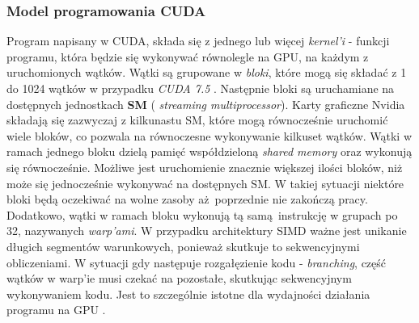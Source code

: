 \subsubsection{Model programowania CUDA}
Program napisany w CUDA, składa się z jednego lub więcej
\textit{kernel'i} - funkcji programu, która będzie się wykonywać równolegle na GPU, na każdym z uruchomionych wątków.
Wątki są grupowane w \textit{bloki}, które mogą się składać z 1 do 1024 wątków w przypadku \textit{CUDA 7.5} \cite{CudaDeveloper}.
Następnie bloki są uruchamiane na dostępnych jednostkach \textbf{SM} ( \textit{streaming multiprocessor}).
Karty graficzne Nvidia składają się zazwyczaj z kilkunastu SM, które mogą równocześnie uruchomić wiele
bloków, co pozwala na równoczesne wykonywanie kilkuset wątków.
Wątki w ramach jednego bloku dzielą pamięć współdzieloną \textit{shared memory} oraz wykonują się równocześnie.
Możliwe jest uruchomienie znacznie większej ilości bloków, niż może się jednocześnie wykonywać na dostępnych SM.
W takiej sytuacji niektóre bloki będą oczekiwać na wolne zasoby aż poprzednie nie zakończą pracy.
Dodatkowo, wątki w ramach bloku wykonują tą samą instrukcję w grupach po 32,
nazywanych \textit{warp'ami}.
W przypadku architektury SIMD ważne jest unikanie długich segmentów
warunkowych, ponieważ skutkuje to sekwencyjnymi obliczeniami.
W sytuacji gdy następuje rozgałęzienie kodu - \textit{branching},
część wątków w warp'ie musi czekać na pozostałe, skutkując sekwencyjnym wykonywaniem kodu.
Jest to szczególnie istotne dla wydajności działania programu na GPU \cite{CudaDeveloper}.
